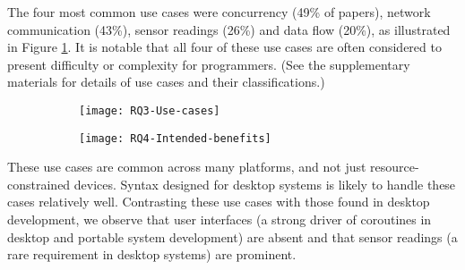 \DIFdelbegin %
{%
}
{%
}
{%
}

\DIFdelend The four most common use cases were concurrency (49\% of papers), network communication (43\%), sensor readings (26\%) and data flow (20\%), as illustrated in Figure \ref{fig:rq3}. It is notable that all four of these use cases are often considered to present difficulty or complexity for programmers. (See the supplementary materials for details of use cases and their classifications.)

\DIFaddbegin \begin{figure}[h]
	\centering
	\begin{subfigure}[h]{0.46\textwidth}
		\centering
		\texttt{[image: RQ3-Use-cases]}
		\caption{}
		\label{fig:rq3}
	\end{subfigure}
	\begin{subfigure}[h]{0.46\textwidth}
		\centering
		\texttt{[image: RQ4-Intended-benefits]}
		\caption{}
		\label{fig:rq4}
	\end{subfigure}
	\caption{}
\end{figure}

\DIFaddend These use cases are common across many platforms, and not just resource-constrained devices. Syntax designed for desktop systems is likely to handle these cases relatively well. Contrasting these use cases with those found in desktop development, we observe that user interfaces (a strong driver of coroutines in desktop and portable system development) are absent and that sensor readings (a rare requirement in desktop systems) are prominent.

